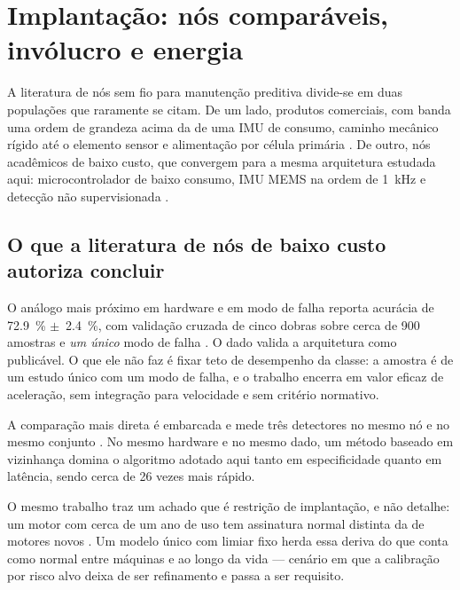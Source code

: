 \section{Implantação: nós comparáveis, invólucro e energia}
\label{sec:rev-implantacao}

A literatura de nós sem fio para manutenção preditiva divide-se em duas populações que
raramente se citam. De um lado, produtos comerciais, com banda uma ordem de grandeza acima
da de uma IMU de consumo, caminho mecânico rígido até o elemento sensor e alimentação por
célula primária \cite{bentlynevada2025,erbessd2025,tractian2022}. De outro, nós acadêmicos
de baixo custo, que convergem para a mesma arquitetura estudada aqui: microcontrolador de
baixo consumo, IMU MEMS na ordem de \SI{1}{\kilo\hertz} e detecção não supervisionada
\cite{kolok2025,antonini2023,bisio2025}.

\subsection{O que a literatura de nós de baixo custo autoriza concluir}

O análogo mais próximo em hardware e em modo de falha reporta acurácia de
\SI{72,9}{\percent} $\pm$~\SI{2,4}{\percent}, com validação cruzada de cinco dobras sobre
cerca de \num{900} amostras e \emph{um único} modo de falha \cite{kolok2025}. O dado valida
a arquitetura como publicável. O que ele não faz é fixar teto de desempenho da classe: a
amostra é de um estudo único com um modo de falha, e o trabalho encerra em valor eficaz de
aceleração, sem integração para velocidade e sem critério normativo.

A comparação mais direta é embarcada e mede três detectores no mesmo nó e no mesmo
conjunto \cite{chevtchenko2023}. No mesmo hardware e no mesmo dado, um método baseado em
vizinhança domina o algoritmo adotado aqui tanto em especificidade quanto em latência,
sendo cerca de \num{26} vezes mais rápido. 

O mesmo trabalho traz um achado que é restrição de implantação, e não detalhe: um motor com
cerca de um ano de uso tem assinatura normal distinta da de motores novos
\cite{chevtchenko2023}. Um modelo único com limiar fixo herda essa deriva do que conta como
normal entre máquinas e ao longo da vida --- cenário em que a calibração por risco alvo
deixa de ser refinamento e passa a ser requisito.

